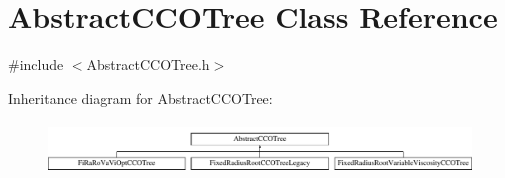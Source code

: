 \hypertarget{class_abstract_c_c_o_tree}{}\section{Abstract\+C\+C\+O\+Tree Class Reference}
\label{class_abstract_c_c_o_tree}


{\ttfamily \#include $<$Abstract\+C\+C\+O\+Tree.\+h$>$}

Inheritance diagram for Abstract\+C\+C\+O\+Tree\+:\begin{figure}[H]
\begin{center}
\leavevmode
\includegraphics[height=1.398252cm]{d7/da0/class_abstract_c_c_o_tree}
\end{center}
\end{figure}
